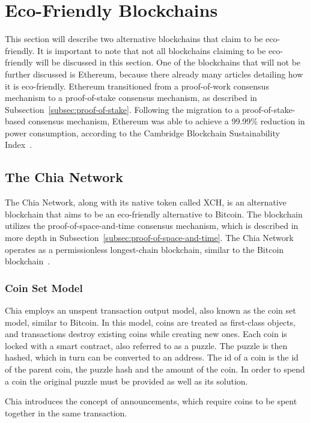 
\section{Eco-Friendly Blockchains}\label{sec:alternative-blockchains}
This section will describe two alternative blockchains that claim to be eco-friendly.
It is important to note that not all blockchains claiming to be eco-friendly will be discussed in this section.
One of the blockchains that will not be further discussed is Ethereum, because there already many articles detailing how it is eco-friendly.
Ethereum transitioned from a proof-of-work consensus mechanism to a proof-of-stake consensus mechanism, as described in Subsection~\ref{subsec:proof-of-stake}.
Following the migration to a proof-of-stake-based consensus mechanism, Ethereum was able to achieve a 99.99\% reduction in power consumption, according to the Cambridge Blockchain Sustainability Index~\cite{CBECI}.


\subsection{The Chia Network}\label{subsec:chia}
The Chia Network, along with its native token called XCH, is an alternative blockchain that aims to be an eco-friendly alternative to Bitcoin.
The blockchain utilizes the proof-of-space-and-time consensus mechanism, which is described in more depth in Subsection~\ref{subsec:proof-of-space-and-time}.
The Chia Network operates as a permissionless longest-chain blockchain, similar to the Bitcoin blockchain~\cite{chia-whitepaper,chia-greenpaper}.

\subsubsection{Coin Set Model}
Chia employs an unspent transaction output model, also known as the coin set model, similar to Bitcoin.
In this model, coins are treated as first-class objects, and transactions destroy existing coins while creating new ones.
Each coin is locked with a smart contract, also referred to as a puzzle.
The puzzle is then hashed, which in turn can be converted to an address.
The id of a coin is the id of the parent coin, the puzzle hash and the amount of the coin.
In order to spend a coin the original puzzle must be provided as well as its solution.

Chia introduces the concept of announcements, which require coins to be spent together in the same transaction.

